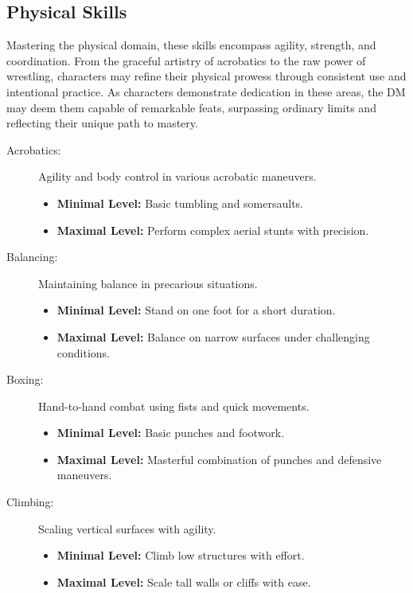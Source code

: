 \documentclass[12pt]{book}  %
\begin{document}
\subsection{\textbf{Physical Skills}}

Mastering the physical domain, these skills encompass agility, strength, and coordination. From the graceful artistry of acrobatics to the raw power of wrestling, characters may refine their physical prowess through consistent use and intentional practice. As characters demonstrate dedication in these areas, the DM may deem them capable of remarkable feats, surpassing ordinary limits and reflecting their unique path to mastery.

\begin{description}
    \item[Acrobatics:] Agility and body control in various acrobatic maneuvers.
        \begin{itemize}
            \item \textbf{Minimal Level:} Basic tumbling and somersaults.
            \item \textbf{Maximal Level:} Perform complex aerial stunts with precision.
        \end{itemize}
    
    \item[Balancing:] Maintaining balance in precarious situations.
        \begin{itemize}
            \item \textbf{Minimal Level:} Stand on one foot for a short duration.
            \item \textbf{Maximal Level:} Balance on narrow surfaces under challenging conditions.
        \end{itemize}

    \item[Boxing:] Hand-to-hand combat using fists and quick movements.
        \begin{itemize}
            \item \textbf{Minimal Level:} Basic punches and footwork.
            \item \textbf{Maximal Level:} Masterful combination of punches and defensive maneuvers.
        \end{itemize}

    \item[Climbing:] Scaling vertical surfaces with agility.
        \begin{itemize}
            \item \textbf{Minimal Level:} Climb low structures with effort.
            \item \textbf{Maximal Level:} Scale tall walls or cliffs with ease.
        \end{itemize}


\end{description}
\end{document}
